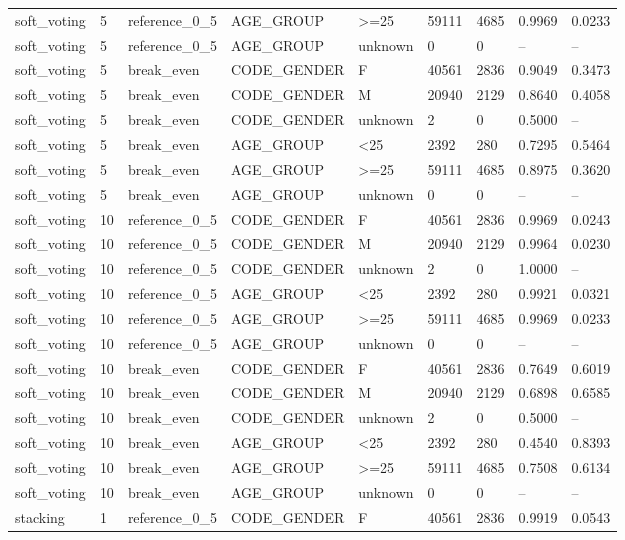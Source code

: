 \begin{longtable}{lllllllll}
soft\_voting & 5 & reference\_0\_5 & AGE\_GROUP & >=25 & 59111 & 4685 & 0.9969 & 0.0233 \\
soft\_voting & 5 & reference\_0\_5 & AGE\_GROUP & unknown & 0 & 0 & -- & -- \\
soft\_voting & 5 & break\_even & CODE\_GENDER & F & 40561 & 2836 & 0.9049 & 0.3473 \\
soft\_voting & 5 & break\_even & CODE\_GENDER & M & 20940 & 2129 & 0.8640 & 0.4058 \\
soft\_voting & 5 & break\_even & CODE\_GENDER & unknown & 2 & 0 & 0.5000 & -- \\
soft\_voting & 5 & break\_even & AGE\_GROUP & <25 & 2392 & 280 & 0.7295 & 0.5464 \\
soft\_voting & 5 & break\_even & AGE\_GROUP & >=25 & 59111 & 4685 & 0.8975 & 0.3620 \\
soft\_voting & 5 & break\_even & AGE\_GROUP & unknown & 0 & 0 & -- & -- \\
soft\_voting & 10 & reference\_0\_5 & CODE\_GENDER & F & 40561 & 2836 & 0.9969 & 0.0243 \\
soft\_voting & 10 & reference\_0\_5 & CODE\_GENDER & M & 20940 & 2129 & 0.9964 & 0.0230 \\
soft\_voting & 10 & reference\_0\_5 & CODE\_GENDER & unknown & 2 & 0 & 1.0000 & -- \\
soft\_voting & 10 & reference\_0\_5 & AGE\_GROUP & <25 & 2392 & 280 & 0.9921 & 0.0321 \\
soft\_voting & 10 & reference\_0\_5 & AGE\_GROUP & >=25 & 59111 & 4685 & 0.9969 & 0.0233 \\
soft\_voting & 10 & reference\_0\_5 & AGE\_GROUP & unknown & 0 & 0 & -- & -- \\
soft\_voting & 10 & break\_even & CODE\_GENDER & F & 40561 & 2836 & 0.7649 & 0.6019 \\
soft\_voting & 10 & break\_even & CODE\_GENDER & M & 20940 & 2129 & 0.6898 & 0.6585 \\
soft\_voting & 10 & break\_even & CODE\_GENDER & unknown & 2 & 0 & 0.5000 & -- \\
soft\_voting & 10 & break\_even & AGE\_GROUP & <25 & 2392 & 280 & 0.4540 & 0.8393 \\
soft\_voting & 10 & break\_even & AGE\_GROUP & >=25 & 59111 & 4685 & 0.7508 & 0.6134 \\
soft\_voting & 10 & break\_even & AGE\_GROUP & unknown & 0 & 0 & -- & -- \\
stacking & 1 & reference\_0\_5 & CODE\_GENDER & F & 40561 & 2836 & 0.9919 & 0.0543 \\

\end{longtable}
